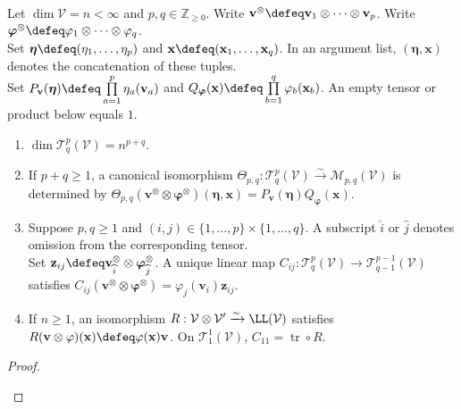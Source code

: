 \begin{proposition} \label{prop:tensor-spaces-as-multilinear-functionals} \\
Let $\dim\mathcal{V}=n<\infty$ and $p,q\in\mathbb{Z}_{\geq0}$. Write $\mathbf{v}^{\otimes}\defeq\mathbf{v}_1\otimes\cdots\otimes\mathbf{v}_p$. Write $\boldsymbol{\varphi}^{\otimes}\defeq\varphi_1\otimes\cdots\otimes\varphi_q$.\\
Set $\boldsymbol{\eta}\defeq(\eta_1,\ldots,\eta_p)$ and $\mathbf{x}\defeq(\mathbf{x}_1,\ldots,\mathbf{x}_q)$. In an argument list, $(\boldsymbol{\eta},\mathbf{x})$ denotes the concatenation of these tuples.\\
Set $P_{\mathbf{v}}(\boldsymbol{\eta})\defeq\prod\limits_{a=1}^{p}\eta_a(\mathbf{v}_a)$ and $Q_{\boldsymbol{\varphi}}(\mathbf{x})\defeq\prod\limits_{b=1}^{q}\varphi_b(\mathbf{x}_b)$. An empty tensor or product below equals $1$.
\begin{enumerate}[label=(\roman*)]
\setlength{\itemsep}{0pt}
\item $\dim\mathcal{T}^{p}_{q}(\mathcal{V})=n^{p+q}$.
\item If $p+q\geq1$, a canonical isomorphism $\Theta_{p,q}:\mathcal{T}^{p}_{q}(\mathcal{V})\xrightarrow{\sim}\mathcal{M}_{p,q}(\mathcal{V})$ is determined by $\Theta_{p,q}(\mathbf{v}^{\otimes}\otimes\boldsymbol{\varphi}^{\otimes})(\boldsymbol{\eta},\mathbf{x})=P_{\mathbf{v}}(\boldsymbol{\eta})Q_{\boldsymbol{\varphi}}(\mathbf{x})$.
\item Suppose $p,q\geq1$ and $(i,j)\in\{1,\ldots,p\}\times\{1,\ldots,q\}$. A subscript $\widehat{i}$ or $\widehat{j}$ denotes omission from the corresponding tensor.\\
Set $\mathbf{z}_{ij}\defeq\mathbf{v}_{\widehat{i}}^{\otimes}\otimes\boldsymbol{\varphi}_{\widehat{j}}^{\otimes}$. A unique linear map $C_{ij}:\mathcal{T}^{p}_{q}(\mathcal{V})\to\mathcal{T}^{p-1}_{q-1}(\mathcal{V})$ satisfies $C_{ij}(\mathbf{v}^{\otimes}\otimes\boldsymbol{\varphi}^{\otimes})=\varphi_j(\mathbf{v}_i)\mathbf{z}_{ij}$.
\item If $n\geq1$, an isomorphism $R:\mathcal{V}\otimes\mathcal{V}'\xrightarrow{\sim}\LL(\mathcal{V})$ satisfies $R(\mathbf{v}\otimes\varphi)(\mathbf{x})\defeq\varphi(\mathbf{x})\mathbf{v}$. On $\mathcal{T}^{1}_{1}(\mathcal{V})$, $C_{11}=\operatorname{tr}\circ R$.
\end{enumerate}
\begin{proof}
\begin{enumerate}[label=(\roman*)]
\setlength{\itemsep}{0pt}

\end{enumerate}
\end{proof}
\end{proposition}
